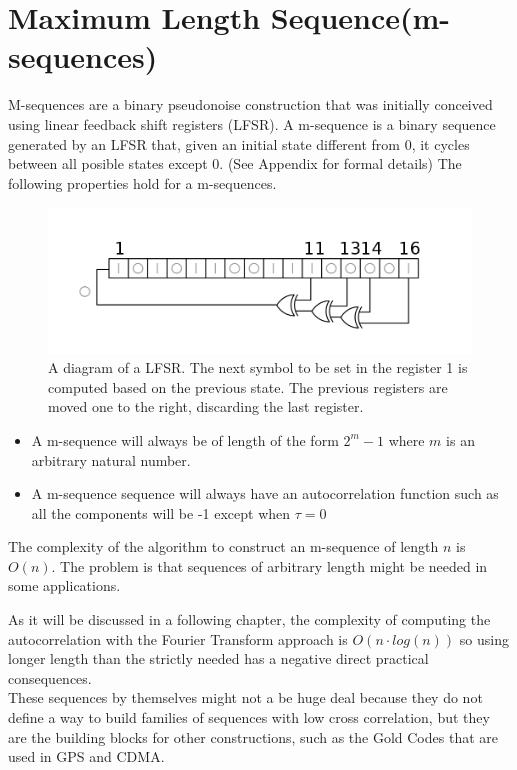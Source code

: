 \section{Maximum Length Sequence(m-sequences)}

M-sequences are a binary pseudonoise construction that was initially conceived using
linear feedback shift registers (LFSR). A m-sequence is a binary sequence generated
by an LFSR that, given an initial state different from 0, it cycles between all
posible states except 0. (See Appendix for formal details) The following properties
hold for a m-sequences.

\begin{figure}
  \includegraphics[scale=0.5]{Chapters/PRN_generation/LFSR-F16.svg.png}
  \caption{A diagram of a LFSR. The next symbol to be set in the register 1
  is computed based on the previous state. The previous registers are moved one
  to the right, discarding the last register.}
  \label{}
\end{figure}

\begin{itemize}
\item   A m-sequence will always be of length of the form $2^{m}-1$ where $m$ is an
  arbitrary natural number.
\item A m-sequence sequence will always have an autocorrelation function such as
  all the components will be -1 except when $\tau = 0$
\end{itemize}
The complexity of the algorithm to construct an m-sequence of length $n$ is $O(n)$. The problem is
that sequences of arbitrary length might be needed in some applications.

 As it will be discussed in a following chapter, the complexity of computing the
autocorrelation with the Fourier Transform approach is $O(n \cdot log(n))$ so using longer length than the strictly needed  has a  negative direct practical consequences.\\

These sequences by themselves might not a be huge deal because they do not define a way to build families of sequences with low cross correlation, but they are the
building blocks for other constructions, such as the Gold Codes that are used in GPS and  CDMA.
